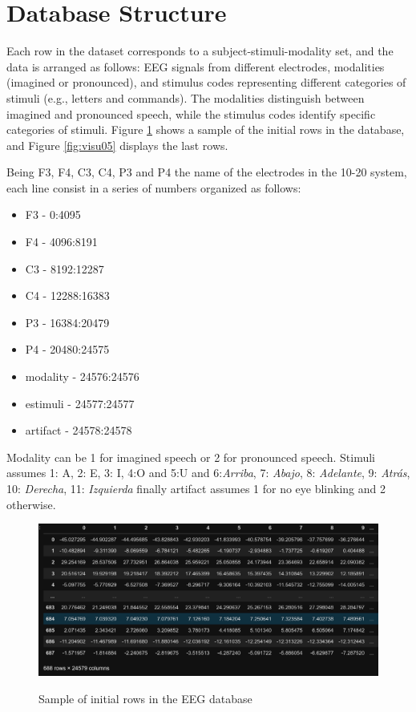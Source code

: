 \documentclass[format=sigconf]{acmart}
\begin{document}
	\section{Database Structure}
		\par Each row in the dataset corresponds to a subject-stimuli-modality set, and the data is arranged as follows: EEG signals from different electrodes, modalities (imagined or pronounced), and stimulus codes representing different categories of stimuli (e.g., letters and commands). The modalities distinguish between imagined and pronounced speech, while the stimulus codes identify specific categories of stimuli. Figure \ref{fig:visu04} shows a sample of the initial rows in the database, and Figure \ref{fig:visu05} displays the last rows.\newline
		
		\par Being F3, F4, C3, C4, P3 and P4 the name of the electrodes in the 10-20 system, each line consist in a series of numbers organized as follows:
		
		\begin{itemize}
			\item F3 - 0:4095
			\item F4 - 4096:8191
			\item C3 - 8192:12287
			\item C4 - 12288:16383
			\item P3 - 16384:20479
			\item P4 - 20480:24575
			\item modality - 24576:24576
			\item estimuli - 24577:24577
			\item artifact - 24578:24578
		\end{itemize}
	
		\par Modality can be 1 for imagined speech or 2 for pronounced speech. Stimuli assumes 1: A, 2: E, 3: I, 4:O and 5:U and 6:\textit{Arriba}, 7: \textit{Abajo}, 8: \textit{Adelante}, 9: \textit{Atrás}, 10: \textit{Derecha}, 11: \textit{Izquierda} finally artifact assumes 1 for no eye blinking and 2 otherwise.
		
		\begin{figure}[h]
			\centering
			\caption{Sample of initial rows in the EEG database}
			\includegraphics[width=\linewidth]{../presentation/images/visu04}
			\label{fig:visu04}
		\end{figure}
		
\end{document}
